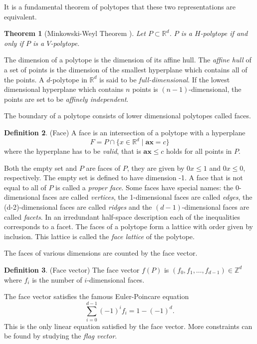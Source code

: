 \documentclass[a4paper,12pt]{book}
\theoremstyle{plain}
\newtheorem{theorem}{Theorem}[section]
\theoremstyle{definition}
\newtheorem{definition}[theorem]{Definition}
\begin{document}
It is a fundamental theorem of polytopes that these two representations are 
equivalent.
\begin{theorem}[Minkowski-Weyl Theorem {\cite[Thm. 1.1.]{PolyLec}}] Let $P \subset \mathbb{R}^d$. 
$P$ is a $H$-polytope if and only if $P$ is a $V$-polytope.
\end{theorem}
The dimension of a polytope is the dimension of its affine hull. The \textit{affine 
hull} of a set of points is the dimension of the smallest hyperplane which 
contains all of the points. A $d$-polytope in $\mathbb{R}^d$ is said to be 
\textit{full-dimensional}. If the lowest dimensional hyperplane which contains 
$n$ points is $(n-1)$-dimensional, the points are set to be \textit{affinely 
independent}.

 The boundary 
of a polytope consists of lower dimensional polytopes called faces. 
\begin{definition}
 (Face) A face is an intersection of a polytope with a hyperplane 
\begin{equation}
 F = P \cap \{x \in \mathbb{R}^d \mid \mathbf{a}\mathbf{x} = c\}
\end{equation}
where the hyperplane has to be \textit{valid}, that is $\mathbf{a}\mathbf{x} 
\leq c$ holds for all points in $P$. 

\end{definition}
Both the empty set and $P$ are faces of $P$, they are given by $0x \le 1$ and $0x \le 0$, respectively.
The empty set is defined to have dimension -1.
A face that is not equal to all of $P$ is called a \textit{proper face}.
Some faces have special names: the 0-dimensional faces are called 
\textit{vertices}, the 1-dimensional faces are called \textit{edges}, the (d-2)-dimensional
faces are called \textit{ridges} and the 
$(d-1)$-dimensional faces are called \textit{facets}. In an irredundant 
half-space description each of the inequalities corresponds to a facet.
 The faces of a polytope 
form a lattice with order given by inclusion. This lattice is called the 
\textit{face lattice} of the polytope.

The faces of various dimensions 
are counted by the face vector.
\begin{definition}
 (Face vector) The face vector $f(P)$ is $(f_0, f_1, \dots, f_{d-1}) \in \mathbb{Z}^d$ 
where $f_i$ is 
the number of $i$-dimensional faces.
\end{definition}
The face vector satisfies the famous Euler-Poincare equation
\begin{equation}
 \sum_{i=0}^{d-1} (-1)^i f_i = 1 - (-1)^d.
\end{equation}
This is the only linear equation satisfied by the face vector. More 
constraints can be found by studying the \textit{flag vector}.
\end{document}
